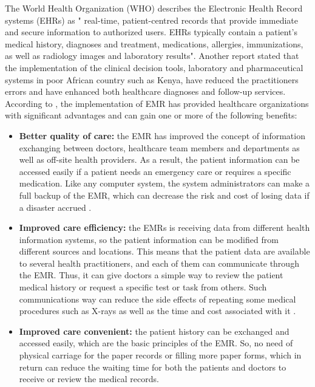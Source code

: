 %
%
The World Health Organization (WHO) \cite{WorldHealthOrganization2016} describes the Electronic Health Record systems (EHRs) as  " real-time, patient-centred records that provide immediate and secure information to authorized users. EHRs typically contain a patient’s medical history, diagnoses and treatment, medications, allergies, immunizations, as well as radiology images and laboratory results". Another report \cite{WorldHealthOrganization2013} stated that the implementation of the clinical decision tools, laboratory and pharmaceutical systems in poor African country such as Kenya, have reduced the practitioners errors and have enhanced both healthcare diagnoses and follow-up services. According to  \cite{OfHealth}, the implementation of EMR has provided healthcare organizations with significant advantages and can gain one or more of the following benefits:
\begin{itemize}
	\item \textbf{Better quality of care:} the EMR has improved the concept of information exchanging between doctors, healthcare team members and departments as well as off-site health providers. As a result, the patient information can be accessed easily if a patient needs an emergency care or requires a specific medication. Like any computer system, the system administrators can make a full backup of the EMR, which can decrease the risk and cost of losing data if a disaster accrued  \cite{OfHealth}.
	\item \textbf{Improved care efficiency:} the EMRs is receiving data from different health information systems, so the patient information can be modified from different sources and locations. This means that the patient data are available to several health practitioners, and each of them can communicate through the EMR. Thus, it can give doctors a simple way to review the patient medical history or request a specific test or task from others. Such communications way can reduce the side effects of repeating some medical procedures such as X-rays as well as the time and cost associated with it \cite{OfHealth}. 
	\item \textbf{Improved care convenient:} the patient history can be exchanged and accessed easily, which are the basic principles of the EMR. So, no need of physical carriage for the paper records or filling more paper forms, which in return can reduce the waiting time for both the patients and doctors to receive or review the medical records\cite{OfHealth}.
\end{itemize}


